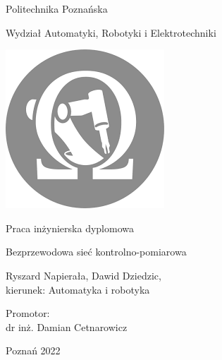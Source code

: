 \documentclass[12pt,oneside,a4paper]{book}
\theoremstyle{break}
\newcommand{\university}{Politechnika Poznańska}
\newcommand{\department}{Wydział Automatyki, Robotyki i Elektrotechniki}
\newcommand{\topic}{Bezprzewodowa sieć kontrolno-pomiarowa}
\newcommand{\authors}{Ryszard Napierała, Dawid Dziedzic}
\begin{document}
\thispagestyle{empty}
\begin{center}
    {\sc \Large \university}
    \par\vspace{0.2cm}\par
    {\large \department}
\end{center}
\vspace{1cm}
\begin{center}
    \includegraphics{warie_logo.png}
\end{center}
\begin{center}
    {\large Praca inżynierska dyplomowa}
    \par\vspace{0.2cm}\par
    {\LARGE \topic}
\end{center}
\begin{center}
    \authors, \\
    kierunek: Automatyka i robotyka
\end{center}
\par\vspace{3cm}\par
\begin{flushright}
    Promotor:\\
    dr inż. Damian Cetnarowicz
\end{flushright}
\vfill
\begin{center}
    Poznań 2022
\end{center}

\newpage
\end{document}
